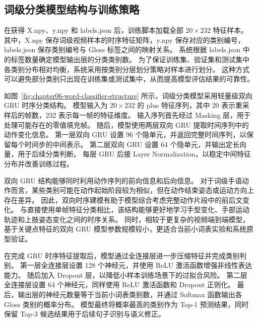
\subsection{词级分类模型结构与训练策略}

在获得 X.npy、y.npy 和 labels.json 后，训练脚本加载全部 $20\times232$ 特征样本。
其中，X.npy 保存词级视频样本的时序特征矩阵，y.npy 保存对应的类别编号，labels.json 保存类别编号与 Gloss 标签之间的映射关系。
系统根据 labels.json 中的标签数量确定模型输出层的分类类别数。
为了保证训练集、验证集和测试集中各类别分布相对均衡，系统采用按类别分层划分策略对样本进行划分。
这种方式可以避免部分类别只出现在训练集或测试集中，从而提高模型评估结果的可靠性。


如图~\ref{fig:chapter06-word-classifier-structure} 所示，词级分类模型采用轻量级双向 GRU 时序分类结构。
模型输入为 $20\times232$ 的 plus 特征序列，其中 20 表示重采样后的帧数，232 表示每一帧的特征维度。
输入序列首先经过 Masking 层，用于处理可能存在的零值填充帧。
随后，模型使用两层双向 GRU 提取时间序列中的动作变化信息。
第一层双向 GRU 设置 96 个隐单元，并返回完整时间序列，以保留每个时间步的中间表示。
第二层双向 GRU 设置 64 个隐单元，并输出定长向量，用于后续分类判断。
每层 GRU 后接 Layer Normalization，以稳定中间特征分布并改善训练过程。

双向 GRU 结构能够同时利用动作序列的前向信息和后向信息。
对于词级手语动作而言，某些类别可能在动作起始阶段较为相似，但在动作结束姿态或运动方向上存在差异。
因此，双向时序建模有助于模型综合考虑完整动作片段中的前后文变化。
与直接使用单帧特征分类相比，该结构能够更好地学习手型变化、手部运动轨迹和上肢姿态变化之间的时序关系。
同时，相较于更复杂的视频端到端模型，基于关键点特征的双向 GRU 模型参数规模较小，更适合当前小词表实验和系统原型验证。

在完成 GRU 时序特征提取后，模型通过全连接层进一步压缩特征并完成类别判别。
第一层全连接层设置 128 个神经元，并使用 ReLU 激活函数增强非线性表达能力。
随后加入 Dropout 层，以降低小样本训练场景下的过拟合风险。
第二层全连接层设置 64 个神经元，同样使用 ReLU 激活函数和 Dropout 正则化。
最后，输出层的神经元数量等于当前小词表类别数，并通过 Softmax 函数输出各 Gloss 类别的概率分布。
模型最终将概率最高的类别作为 Top-1 预测结果，同时保留 Top-3 候选结果用于后续句子识别与语义修正。

